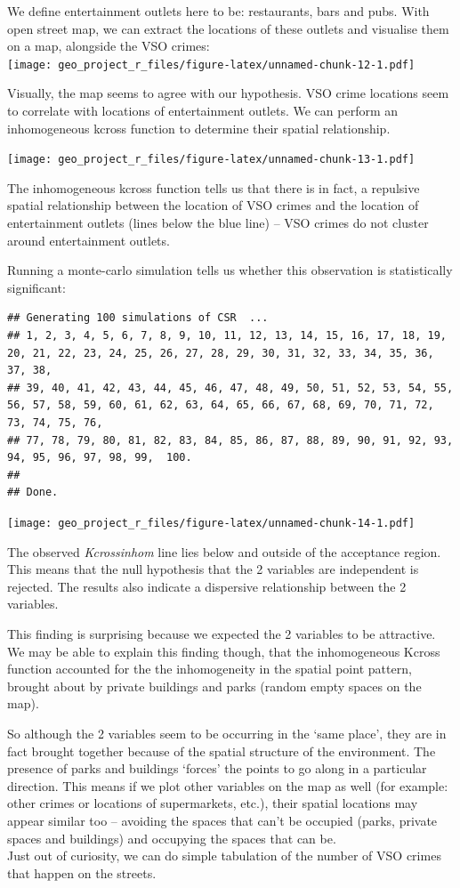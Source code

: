 \documentclass[]{article}
\theoremstyle{definition}
\theoremstyle{definition}
\theoremstyle{definition}
\theoremstyle{remark}
\begin{document}
We define entertainment outlets here to be: restaurants, bars and pubs.
With open street map, we can extract the locations of these outlets and
visualise them on a map, alongside the VSO crimes:\\
\texttt{[image: geo\_project\_r\_files/figure-latex/unnamed-chunk-12-1.pdf]}

Visually, the map seems to agree with our hypothesis. VSO crime
locations seem to correlate with locations of entertainment outlets. We
can perform an inhomogeneous kcross function to determine their spatial
relationship.

\texttt{[image: geo\_project\_r\_files/figure-latex/unnamed-chunk-13-1.pdf]}

The inhomogeneous kcross function tells us that there is in fact, a
repulsive spatial relationship between the location of VSO crimes and
the location of entertainment outlets (lines below the blue line) -- VSO
crimes do not cluster around entertainment outlets.

Running a monte-carlo simulation tells us whether this observation is
statistically significant:

\begin{verbatim}
## Generating 100 simulations of CSR  ...
## 1, 2, 3, 4, 5, 6, 7, 8, 9, 10, 11, 12, 13, 14, 15, 16, 17, 18, 19, 20, 21, 22, 23, 24, 25, 26, 27, 28, 29, 30, 31, 32, 33, 34, 35, 36, 37, 38,
## 39, 40, 41, 42, 43, 44, 45, 46, 47, 48, 49, 50, 51, 52, 53, 54, 55, 56, 57, 58, 59, 60, 61, 62, 63, 64, 65, 66, 67, 68, 69, 70, 71, 72, 73, 74, 75, 76,
## 77, 78, 79, 80, 81, 82, 83, 84, 85, 86, 87, 88, 89, 90, 91, 92, 93, 94, 95, 96, 97, 98, 99,  100.
## 
## Done.
\end{verbatim}

\texttt{[image: geo\_project\_r\_files/figure-latex/unnamed-chunk-14-1.pdf]}

The observed \emph{Kcrossinhom} line lies below and outside of the
acceptance region. This means that the null hypothesis that the 2
variables are independent is rejected. The results also indicate a
dispersive relationship between the 2 variables.

This finding is surprising because we expected the 2 variables to be
attractive. We may be able to explain this finding though, that the
inhomogeneous Kcross function accounted for the the inhomogeneity in the
spatial point pattern, brought about by private buildings and parks
(random empty spaces on the map).

So although the 2 variables seem to be occurring in the `same place',
they are in fact brought together because of the spatial structure of
the environment. The presence of parks and buildings `forces' the points
to go along in a particular direction. This means if we plot other
variables on the map as well (for example: other crimes or locations of
supermarkets, etc.), their spatial locations may appear similar too --
avoiding the spaces that can't be occupied (parks, private spaces and
buildings) and occupying the spaces that can be.\\
Just out of curiosity, we can do simple tabulation of the number of VSO
crimes that happen on the streets.
\end{document}
